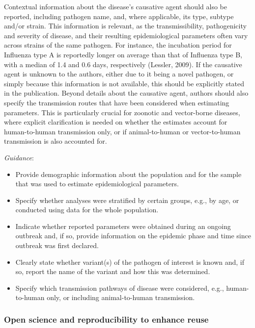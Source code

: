 \documentclass[
  10pt,
  letterpaper,
]{article}
\providecommand{\tightlist}{%
  \setlength{\itemsep}{0pt}\setlength{\parskip}{0pt}}\usepackage{longtable,booktabs,array}
\begin{document}
Contextual information about the disease's causative agent should also
be reported, including pathogen name, and, where applicable, its type,
subtype and/or strain. This information is relevant, as the
transmissibility, pathogenicity and severity of disease, and their
resulting epidemiological parameters often vary across strains of the
same pathogen. For instance, the incubation period for Influenza type A
is reportedly longer on average than that of Influenza type B, with a
median of 1.4 and 0.6 days, respectively (Lessler, 2009). If the
causative agent is unknown to the authors, either due to it being a
novel pathogen, or simply because this information is not available,
this should be explicitly stated in the publication. Beyond details
about the causative agent, authors should also specify the transmission
routes that have been considered when estimating parameters. This is
particularly crucial for zoonotic and vector-borne diseases, where
explicit clarification is needed on whether the estimates account for
human-to-human transmission only, or if animal-to-human or
vector-to-human transmission is also accounted for.

\emph{Guidance}:

\begin{itemize}
\tightlist
\item
  Provide demographic information about the population and for the
  sample that was used to estimate epidemiological parameters.
\item
  Specify whether analyses were stratified by certain groups, e.g., by
  age, or conducted using data for the whole population.
\item
  Indicate whether reported parameters were obtained during an ongoing
  outbreak and, if so, provide information on the epidemic phase and
  time since outbreak was first declared.
\item
  Clearly state whether variant(s) of the pathogen of interest is known
  and, if so, report the name of the variant and how this was
  determined.
\item
  Specify which transmission pathways of disease were considered, e.g.,
  human-to-human only, or including animal-to-human transmission.
\end{itemize}

\subsubsection{Open science and reproducibility to enhance
reuse}\label{open-science-and-reproducibility-to-enhance-reuse}
\end{document}
